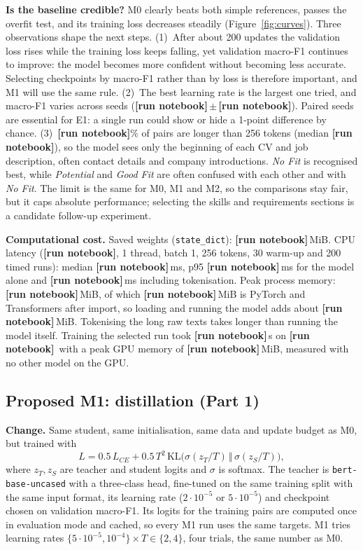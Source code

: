 \documentclass[11pt]{article}
\newcommand{\RUN}{\textbf{[run notebook]}}
\newcommand{\TokPairMedian}{\RUN}\newcommand{\TokPairNinety}{\RUN}\newcommand{\TruncPct}{\RUN}
\newcommand{\MzeroFoneMean}{\RUN}\newcommand{\MzeroFoneSD}{\RUN}\newcommand{\MzeroAccMean}{\RUN}\newcommand{\MzeroAccSD}{\RUN}
\newcommand{\MzeroSizeMB}{\RUN}\newcommand{\MzeroLatMed}{\RUN}\newcommand{\MzeroLatPninetyfive}{\RUN}
\newcommand{\MzeroLatTokMed}{\RUN}\newcommand{\MzeroRSS}{\RUN}\newcommand{\MzeroRSSBase}{\RUN}\newcommand{\MzeroRSSDelta}{\RUN}
\newcommand{\MzeroTrainTime}{\RUN}\newcommand{\MzeroPeakGPU}{\RUN}
\newcommand{\EnvGPU}{\RUN}\newcommand{\EnvCPU}{\RUN}\newcommand{\EnvTorch}{\RUN}\newcommand{\EnvTransformers}{\RUN}
\begin{document}
\textbf{Is the baseline credible?} M0 clearly beats both simple references, passes the overfit test, and its training loss decreases steadily (Figure~\ref{fig:curves}). Three observations shape the next steps.
(1)~After about 200 updates the validation loss rises while the training loss keeps falling, yet validation macro-F1 continues to improve: the model becomes more confident without becoming less accurate. Selecting checkpoints by macro-F1 rather than by loss is therefore important, and M1 will use the same rule.
(2)~The best learning rate is the largest one tried, and macro-F1 varies across seeds (\MzeroFoneMean\,$\pm$\,\MzeroFoneSD). Paired seeds are essential for E1: a single run could show or hide a 1-point difference by chance.
(3)~\TruncPct\% of pairs are longer than 256 tokens (median \TokPairMedian), so the model sees only the beginning of each CV and job description, often contact details and company introductions. \emph{No Fit} is recognised best, while \emph{Potential} and \emph{Good Fit} are often confused with each other and with \emph{No Fit}. The limit is the same for M0, M1 and M2, so the comparisons stay fair, but it caps absolute performance; selecting the skills and requirements sections is a candidate follow-up experiment.

\textbf{Computational cost.} Saved weights (\texttt{state\_dict}): \MzeroSizeMB\,MiB. CPU latency (\EnvCPU, 1 thread, batch 1, 256 tokens, 30 warm-up and 200 timed runs): median \MzeroLatMed\,ms, p95 \MzeroLatPninetyfive\,ms for the model alone and \MzeroLatTokMed\,ms including tokenisation. Peak process memory: \MzeroRSS\,MiB, of which \MzeroRSSBase\,MiB is PyTorch and Transformers after import, so loading and running the model adds about \MzeroRSSDelta\,MiB. Tokenising the long raw texts takes longer than running the model itself. Training the selected run took \MzeroTrainTime\,s on \EnvGPU\ with a peak GPU memory of \MzeroPeakGPU\,MiB, measured with no other model on the GPU.

\subsection{Proposed M1: distillation (Part 1)}
\textbf{Change.} Same student, same initialisation, same data and update budget as M0, but trained with
\begin{equation}
L=0.5\,L_{CE}+0.5\,T^2\,\mathrm{KL}\big(\sigma(z_T/T)\,\Vert\,\sigma(z_S/T)\big),
\end{equation}
where $z_T, z_S$ are teacher and student logits and $\sigma$ is softmax. The teacher is \texttt{bert-base-uncased} with a three-class head, fine-tuned on the same training split with the same input format, its learning rate ($2\cdot10^{-5}$ or $5\cdot10^{-5}$) and checkpoint chosen on validation macro-F1. Its logits for the training pairs are computed once in evaluation mode and cached, so every M1 run uses the same targets. M1 tries learning rates $\{5\cdot10^{-5}, 10^{-4}\} \times T\in\{2,4\}$, four trials, the same number as M0.
\end{document}
